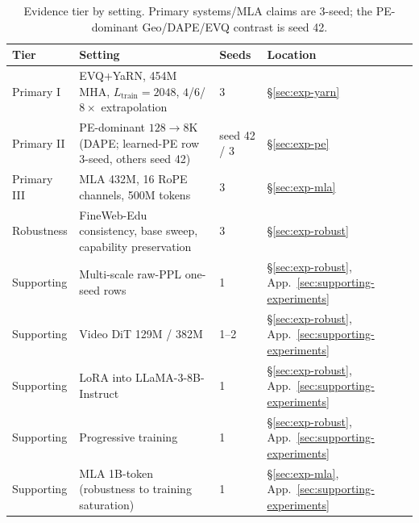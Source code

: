 \begin{table}[h]
\centering
\scriptsize
\setlength{\tabcolsep}{3pt}
\renewcommand{\arraystretch}{0.88}
\caption{Evidence tier by setting. Primary systems/MLA claims are 3-seed; the PE-dominant Geo/DAPE/EVQ contrast is seed 42.}
\label{tab:evidence-tier}
\begin{tabular}{llll}
\toprule
Tier & Setting & Seeds & Location \\
\midrule
Primary I    & EVQ+YaRN, 454M MHA, $L_{\mathrm{train}}{=}2048$, $4$/$6$/$8{\times}$ extrapolation & 3  & \S\ref{sec:exp-yarn}   \\
Primary II   & PE-dominant $128{\to}8\mathrm{K}$ (DAPE; learned-PE row 3-seed, others seed 42) & seed 42 / 3 & \S\ref{sec:exp-pe}     \\
Primary III  & MLA 432M, 16 RoPE channels, 500M tokens                        & 3  & \S\ref{sec:exp-mla}    \\
Robustness   & FineWeb-Edu consistency, base sweep, capability preservation   & 3  & \S\ref{sec:exp-robust} \\
Supporting   & Multi-scale raw-PPL one-seed rows                              & 1  & \S\ref{sec:exp-robust}, App.~\ref{sec:supporting-experiments} \\
Supporting   & Video DiT 129M / 382M                                          & 1--2  & \S\ref{sec:exp-robust}, App.~\ref{sec:supporting-experiments} \\
Supporting   & LoRA into LLaMA-3-8B-Instruct                                  & 1  & \S\ref{sec:exp-robust}, App.~\ref{sec:supporting-experiments} \\
Supporting   & Progressive training                                           & 1  & \S\ref{sec:exp-robust}, App.~\ref{sec:supporting-experiments} \\
Supporting   & MLA 1B-token (robustness to training saturation)               & 1  & \S\ref{sec:exp-mla},     App.~\ref{sec:supporting-experiments} \\
\bottomrule
\end{tabular}
\end{table}
